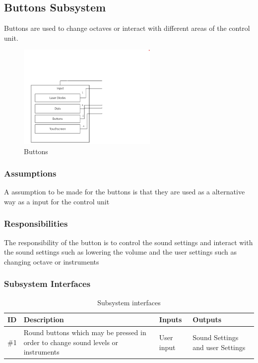 \subsection{Buttons Subsystem}
Buttons are used to change octaves or interact with different areas of the control unit.

\begin{figure}[h!]
	\centering
 	\includegraphics[width=0.60\textwidth]{images/InputSubsystem}
 \caption{Buttons}
\end{figure}

\subsubsection{Assumptions}
A assumption to be made for the buttons is that they are used as a alternative way as a input for the control unit


\subsubsection{Responsibilities}
The responsibility of the button is to control the sound settings and interact with the sound settings such as lowering the volume and the user settings such as changing octave or instruments 


\subsubsection{Subsystem Interfaces}

\begin {table}[H]
\caption {Subsystem interfaces} 
\begin{center}
    \begin{tabular}{|  p{1cm}  |p{6cm}  |p{3cm}  |p{4cm}|}
    \hline
    ID & Description & Inputs & Outputs \\ \hline
    \#1& Round buttons which may be pressed in order to change sound levels or instruments& User input&       Sound Settings and user Settings\\\hline
    \end{tabular}
\end{center}
\end{table}

